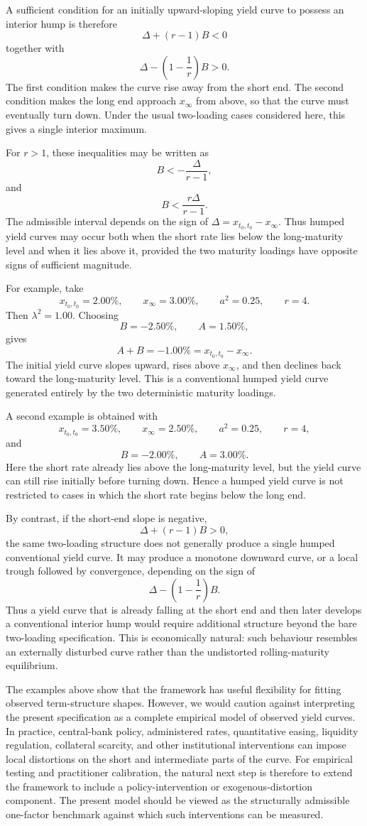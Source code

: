 \documentclass[12pt]{article}
\theoremstyle{statementstyle}
\begin{document}
A sufficient condition for an initially upward-sloping yield curve to possess an interior hump is therefore
\[
\Delta+(r-1)B<0
\]
together with
\[
\Delta-\left(1-\frac{1}{r}\right)B>0.
\]
The first condition makes the curve rise away from the short end. The second condition makes the long end approach \(x_\infty\) from above, so that the curve must eventually turn down. Under the usual two-loading cases considered here, this gives a single interior maximum.

For \(r>1\), these inequalities may be written as
\[
B<-\frac{\Delta}{r-1},
\]
and
\[
B<\frac{r\Delta}{r-1}.
\]
The admissible interval depends on the sign of \(\Delta=x_{t_0,t_0}-x_\infty\). Thus humped yield curves may occur both when the short rate lies below the long-maturity level and when it lies above it, provided the two maturity loadings have opposite signs of sufficient magnitude.

For example, take
\[
x_{t_0,t_0}=2.00\%,
\qquad
x_\infty=3.00\%,
\qquad
a^2=0.25,
\qquad
r=4.
\]
Then \(\lambda^2=1.00\). Choosing
\[
B=-2.50\%,
\qquad
A=1.50\%,
\]
gives
\[
A+B=-1.00\%=x_{t_0,t_0}-x_\infty.
\]
The initial yield curve slopes upward, rises above \(x_\infty\), and then declines back toward the long-maturity level. This is a conventional humped yield curve generated entirely by the two deterministic maturity loadings.

A second example is obtained with
\[
x_{t_0,t_0}=3.50\%,
\qquad
x_\infty=2.50\%,
\qquad
a^2=0.25,
\qquad
r=4,
\]
and
\[
B=-2.00\%,
\qquad
A=3.00\%.
\]
Here the short rate already lies above the long-maturity level, but the yield curve can still rise initially before turning down. Hence a humped yield curve is not restricted to cases in which the short rate begins below the long end.

By contrast, if the short-end slope is negative,
\[
\Delta+(r-1)B>0,
\]
the same two-loading structure does not generally produce a single humped conventional yield curve. It may produce a monotone downward curve, or a local trough followed by convergence, depending on the sign of
\[
\Delta-\left(1-\frac{1}{r}\right)B.
\]
Thus a yield curve that is already falling at the short end and then later develops a conventional interior hump would require additional structure beyond the bare two-loading specification. This is economically natural: such behaviour resembles an externally disturbed curve rather than the undistorted rolling-maturity equilibrium.

The examples above show that the framework has useful flexibility for fitting observed term-structure shapes. However, we would caution against interpreting the present specification as a complete empirical model of observed yield curves. In practice, central-bank policy, administered rates, quantitative easing, liquidity regulation, collateral scarcity, and other institutional interventions can impose local distortions on the short and intermediate parts of the curve. For empirical testing and practitioner calibration, the natural next step is therefore to extend the framework to include a policy-intervention or exogenous-distortion component. The present model should be viewed as the structurally admissible one-factor benchmark against which such interventions can be measured.
\end{document}
